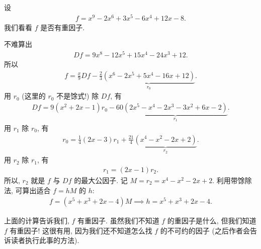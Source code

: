 \begin{example}
    设
    \begin{align*}
        f = x^9-2 x^6+3 x^5-6 x^4+12 x-8.
    \end{align*}
    我们看看 $f$ 是否有重因子.

    不难算出
    \begin{align*}
        Df = 9 x^8-12 x^5+15 x^4-24 x^3+12.
    \end{align*}
    所以
    \begin{align*}
        f = \frac{x}{9} Df - \frac{2}{3} \underbrace{(x^6-2 x^5+5 x^4-16 x+12)}_{r_0}.
    \end{align*}
    用 $r_0$ (这里的 $r_0$ 不是馀式!) 除 $Df$, 有
    \begin{align*}
        Df = 9(x^2+2x-1) r_0 - 60 \underbrace{(2 x^5-x^4-2 x^3-3 x^2+6 x-2)}_{r_1}.
    \end{align*}
    用 $r_1$ 除 $r_0$, 有
    \begin{align*}
        r_0 = \frac{1}{4} (2x-3) r_1 + \frac{21}{4} \underbrace{(x^4-x^2-2 x+2)}_{r_2}.
    \end{align*}
    用 $r_2$ 除 $r_1$, 有
    \begin{align*}
        r_1 = (2x-1) r_2.
    \end{align*}
    所以, $r_2$ 就是 $f$ 与 $Df$ 的最大公因子. 记 $M = r_2 = x^4-x^2-2 x+2$. 利用带馀除法, 可算出适合 $f = hM$ 的 $h$:
    \begin{align*}
        f = (x^5+x^3+2 x-4) M \implies h = x^5+x^3+2 x-4.
    \end{align*}

    上面的计算告诉我们, $f$ 有重因子. 虽然我们不知道 $f$ 的重因子是什么, 但我们知道 $f$ 有重因子! 这很有用, 因为我们还不知道怎么找 $f$ 的不可约的因子 (之后作者会告诉读者执行此事的方法).


\end{example}
